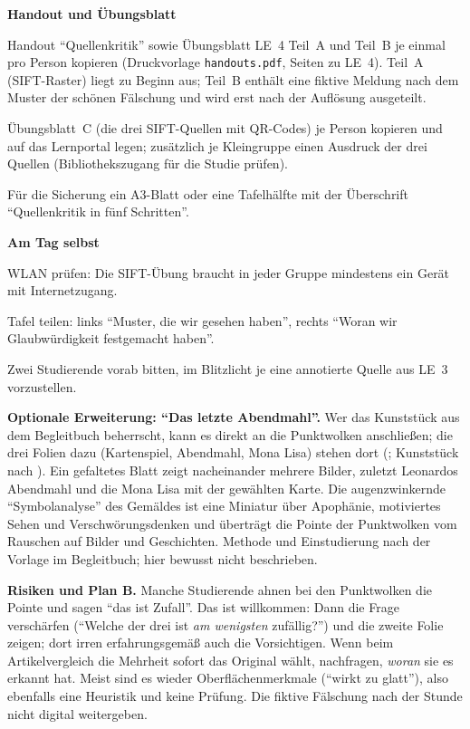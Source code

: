 \begin{vorbereitung}
\textbf{Handout und Übungsblatt}
\begin{checkliste}
  \item Handout \enquote{Quellenkritik} sowie Übungsblatt LE~4 Teil~A und
    Teil~B je einmal pro Person kopieren (Druckvorlage
    \texttt{handouts.pdf}, Seiten zu LE~4). Teil~A (SIFT-Raster) liegt zu
    Beginn aus; Teil~B enthält eine fiktive Meldung nach dem Muster der
    schönen Fälschung und wird erst nach der Auflösung ausgeteilt.
  \item Übungsblatt~C (die drei SIFT-Quellen mit QR-Codes) je Person
    kopieren und auf das Lernportal legen; zusätzlich je Kleingruppe einen
    Ausdruck der drei Quellen (Bibliothekszugang für die Studie prüfen).
  \item Für die Sicherung ein A3-Blatt oder eine Tafelhälfte mit der
    Überschrift \enquote{Quellenkritik in fünf Schritten}.
\end{checkliste}

\textbf{Am Tag selbst}
\begin{checkliste}
  \item WLAN prüfen: Die SIFT-Übung braucht in jeder Gruppe mindestens ein
    Gerät mit Internetzugang.
  \item Tafel teilen: links \enquote{Muster, die wir gesehen haben}, rechts
    \enquote{Woran wir Glaubwürdigkeit festgemacht haben}.
  \item Zwei Studierende vorab bitten, im Blitzlicht je eine annotierte
    Quelle aus LE~3 vorzustellen.
\end{checkliste}

\textbf{Optionale Erweiterung: \enquote{Das letzte Abendmahl}.} Wer das
Kunststück aus dem Begleitbuch beherrscht, kann es direkt an die
Punktwolken anschließen; die drei Folien dazu (Kartenspiel, Abendmahl,
Mona Lisa) stehen dort (; Kunststück nach
\textcite{payne_davinci}). Ein
gefaltetes Blatt zeigt nacheinander mehrere Bilder, zuletzt Leonardos
Abendmahl und die Mona Lisa mit der gewählten Karte. Die augenzwinkernde
\enquote{Symbolanalyse} des Gemäldes ist eine Miniatur über Apophänie,
motiviertes Sehen und Verschwörungsdenken und überträgt die Pointe der
Punktwolken vom Rauschen auf Bilder und Geschichten. Methode und Einstudierung nach der Vorlage im
Begleitbuch; hier bewusst nicht beschrieben.

\textbf{Risiken und Plan B.} Manche Studierende ahnen bei den Punktwolken
die Pointe und sagen \enquote{das ist Zufall}. Das ist willkommen: Dann
die Frage verschärfen (\enquote{Welche der drei ist \emph{am wenigsten}
zufällig?}) und die zweite Folie zeigen; dort irren erfahrungsgemäß auch
die Vorsichtigen. Wenn beim Artikelvergleich die Mehrheit sofort das
Original wählt, nachfragen, \emph{woran} sie es erkannt hat. Meist sind es
wieder Oberflächenmerkmale (\enquote{wirkt zu glatt}), also ebenfalls eine
Heuristik und keine Prüfung. Die fiktive Fälschung nach der Stunde nicht
digital weitergeben.
\end{vorbereitung}

